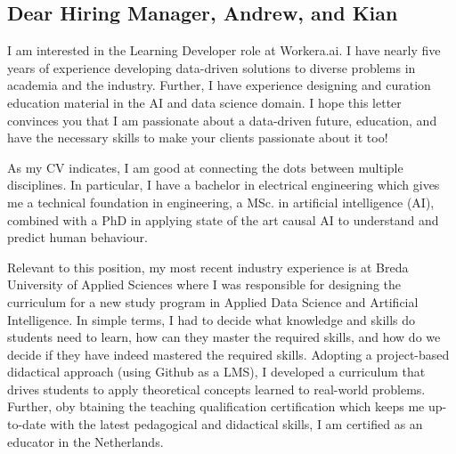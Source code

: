 
\setlength{\parindent}{2em}
\setlength{\parskip}{0.5em}
\renewcommand{\baselinestretch}{1.2}

\begin{flushleft}
\section{Dear Hiring Manager, Andrew, and Kian}
\par
\large{
I am interested in the Learning Developer role at Workera.ai. I have nearly five years of experience developing data-driven solutions to diverse problems in academia and the industry. Further, I have experience designing and curation education material in the AI and data science domain. I hope this letter convinces you that I am passionate about a data-driven future, education, and have the necessary skills to make your clients passionate about it too!

As my CV indicates, I am good at connecting the dots between multiple disciplines. In particular, I have a bachelor in electrical engineering which gives me a technical foundation in engineering, a MSc. in artificial intelligence (AI), combined with a PhD in applying state of the art causal AI to understand and predict human behaviour. 



Relevant to this position, my most recent industry experience is at Breda University of Applied Sciences where I was responsible for designing the curriculum for a new study program in Applied Data Science and Artificial Intelligence. In simple terms, I had to decide what knowledge and skills do students need to learn, how can they master the required skills, and how do we decide if they have indeed mastered the required skills. Adopting a project-based didactical approach (using Github as a LMS), I developed a curriculum that drives students to apply theoretical concepts learned to real-world problems. Further, oby btaining the teaching qualification certification which keeps me up-to-date with the latest pedagogical and didactical skills, I am certified as an educator in the Netherlands. 

}
\end{flushleft}
